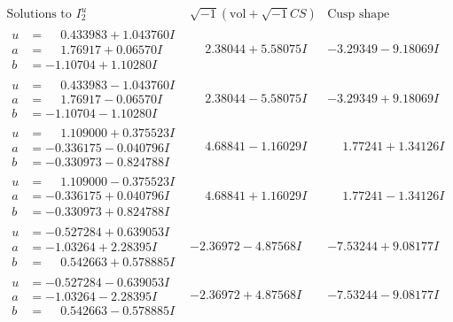\documentclass[1p]{elsarticle_modified}
\theoremstyle{definition}
\newcommand{\I}{\sqrt{-1}}
\begin{document}
$$\begin{array}{c|c|c}  
\text{Solutions to }I^u_{2}& \I (\text{vol} + \sqrt{-1}CS) & \text{Cusp shape}\\
 \hline 
\begin{aligned}
u &= \phantom{-}0.433983 + 1.043760 I \\
a &= \phantom{-}1.76917 + 0.06570 I \\
b &= -1.10704 + 1.10280 I\end{aligned}
 & \phantom{-}2.38044 + 5.58075 I & -3.29349 - 9.18069 I \\ \hline\begin{aligned}
u &= \phantom{-}0.433983 - 1.043760 I \\
a &= \phantom{-}1.76917 - 0.06570 I \\
b &= -1.10704 - 1.10280 I\end{aligned}
 & \phantom{-}2.38044 - 5.58075 I & -3.29349 + 9.18069 I \\ \hline\begin{aligned}
u &= \phantom{-}1.109000 + 0.375523 I \\
a &= -0.336175 - 0.040796 I \\
b &= -0.330973 - 0.824788 I\end{aligned}
 & \phantom{-}4.68841 - 1.16029 I & \phantom{-}1.77241 + 1.34126 I \\ \hline\begin{aligned}
u &= \phantom{-}1.109000 - 0.375523 I \\
a &= -0.336175 + 0.040796 I \\
b &= -0.330973 + 0.824788 I\end{aligned}
 & \phantom{-}4.68841 + 1.16029 I & \phantom{-}1.77241 - 1.34126 I \\ \hline\begin{aligned}
u &= -0.527284 + 0.639053 I \\
a &= -1.03264 + 2.28395 I \\
b &= \phantom{-}0.542663 + 0.578885 I\end{aligned}
 & -2.36972 - 4.87568 I & -7.53244 + 9.08177 I \\ \hline\begin{aligned}
u &= -0.527284 - 0.639053 I \\
a &= -1.03264 - 2.28395 I \\
b &= \phantom{-}0.542663 - 0.578885 I\end{aligned}
 & -2.36972 + 4.87568 I & -7.53244 - 9.08177 I \\ \hline\begin{aligned}

\end{aligned}
\end{array}$$
\end{document}
